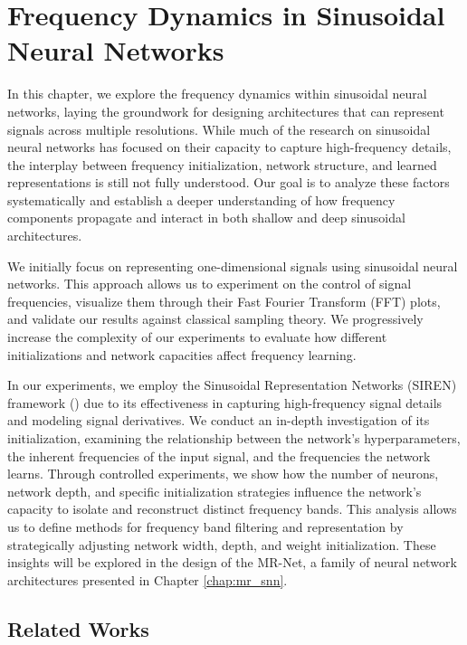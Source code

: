 \chapter{Frequency Dynamics in Sinusoidal Neural Networks}
\label{chap:sinusoidal}

In this chapter, we explore the frequency dynamics within sinusoidal neural networks, laying the groundwork for designing architectures that can represent signals across multiple resolutions. While much of the research on sinusoidal neural networks has focused on their capacity to capture high-frequency details, the interplay between frequency initialization, network structure, and learned representations is still not fully understood. Our goal is to analyze these factors systematically and establish a deeper understanding of how frequency components propagate and interact in both shallow and deep sinusoidal architectures.

We initially focus on representing one-dimensional signals using sinusoidal neural networks. This approach allows us to experiment on the control of signal frequencies, visualize them through their Fast Fourier Transform (FFT) plots, and validate our results against classical sampling theory. We progressively increase the complexity of our experiments to evaluate how different initializations and network capacities affect frequency learning.

In our experiments, we employ the Sinusoidal Representation Networks (SIREN) framework (\cite{sitzmann2019siren}) due to its effectiveness in capturing high-frequency signal details and modeling signal derivatives. We conduct an in-depth investigation of its initialization, examining the relationship between the network’s hyperparameters, the inherent frequencies of the input signal, and the frequencies the network learns. Through controlled experiments, we show how the number of neurons, network depth, and specific initialization strategies influence the network's capacity to isolate and reconstruct distinct frequency bands. This analysis allows us to define methods for frequency band filtering and representation by strategically adjusting network width, depth, and weight initialization. These insights will be explored in the design of the MR-Net, a family of neural network architectures presented in Chapter \ref{chap:mr_snn}.


\section{Related Works}

